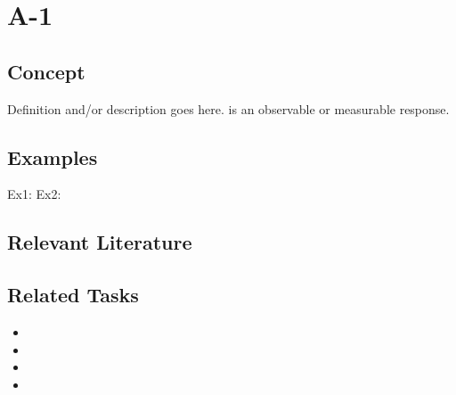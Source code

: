 \chapter{A-1}
{\Large{\fiveaOne{}}}

\section{Concept}
Definition and/or description goes here.
\lipsum[1-4]
is an observable or measurable response.
\section{Examples}
Ex1: \lipsum[1-3]
Ex2: \lipsum[1-3]

\section{Relevant Literature}

\begin{refsection}
\nocite{test,alang2017police,clayton2018black}
\printbibliography[heading=subbibliography]
\end{refsection}


%

\section{Related Tasks}
\begin{itemize}
\item \fouraTwo{}
\item \fouraThree{}
\item \fouraFour{}
\item \fouraFive{}
\end{itemize} 
